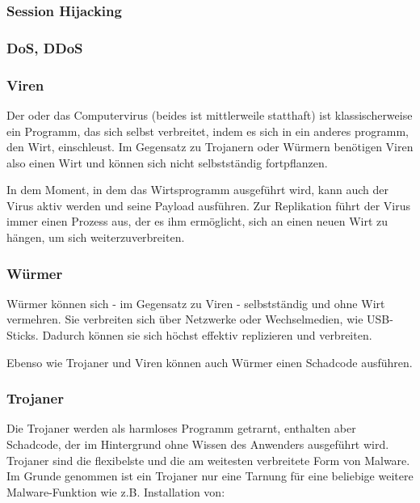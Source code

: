 \subsubsection{Session Hijacking}
\label{sec:SessionHijacking}


\subsubsection{DoS, DDoS}
\label{sec:DoSDDoS}


\subsubsection{Viren}
\label{sec:Viren}

Der oder das Computervirus (beides ist mittlerweile statthaft) ist klassischerweise ein Programm, das sich selbst verbreitet, indem es sich in ein anderes programm, den Wirt, einschleust. Im Gegensatz zu Trojanern oder Würmern benötigen Viren also einen Wirt und können sich nicht selbstständig fortpflanzen.

In dem Moment, in dem das Wirtsprogramm ausgeführt wird, kann auch der Virus aktiv werden und seine Payload ausführen. Zur Replikation führt der Virus immer einen Prozess aus, der es ihm ermöglicht, sich an einen neuen Wirt zu hängen, um sich weiterzuverbreiten.

\subsubsection{Würmer}
\label{sec:Wuermer}

Würmer können sich - im Gegensatz zu Viren - selbstständig und ohne Wirt vermehren. Sie verbreiten sich über Netzwerke oder Wechselmedien, wie USB-Sticks. Dadurch können sie sich höchst effektiv replizieren und verbreiten.

Ebenso wie Trojaner und Viren können auch Würmer einen Schadcode ausführen.

\subsubsection{Trojaner}
\label{sec:Trojaner}

Die Trojaner werden als harmloses Programm getrarnt, enthalten aber Schadcode, der im Hintergrund ohne Wissen des Anwenders ausgeführt wird. Trojaner sind die flexibelste und die am weitesten verbreitete Form von Malware. Im Grunde genommen ist ein Trojaner nur eine Tarnung für eine beliebige weitere Malware-Funktion wie z.B. Installation von:

